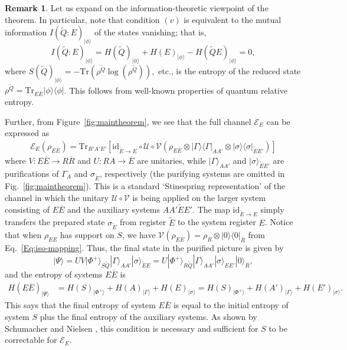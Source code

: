 \documentclass[11pt]{amsart}
\theoremstyle{definition}
\theoremstyle{definition}
\theoremstyle{definition}
\newtheorem{remark}[thm]{Remark}
\newcommand{\mc}{\mathcal}
\newcommand{\tr}{\textrm{Tr}}
\newcommand{\id}{\textrm{id}}
\newcommand{\op}[2]{|#1\rangle\langle #2|}
\newcommand{\1}{\mathbb{I}}
\newcommand{\wt}{\widetilde}
\newcommand{\T}[1]{\widetilde{#1}} %
\def\ket#1{| #1 \rangle}
\begin{document}
\begin{remark}
Let us expand on the information-theoretic viewpoint of the theorem. In particular, note that condition $(v)$ is equivalent to the mutual information $I(\T{Q}:E)_{\ket{\phi}}$ of the states vanishing; that is, 
\begin{equation}\label{mutualinformationequation}
    I(\T{Q}:E)_{\ket{\phi}} = H(\T{Q})_{\ket{\phi}} + H(E)_{\ket{\phi}} - H(\T{Q}E)_{\ket{\phi}} = 0, 
\end{equation}
where $S(\T{Q})_{\ket{\phi}} = - \tr (\rho^{\T{Q}} \log (\rho^{\T{Q}}) ),$ etc., is the entropy of the reduced state $\rho^{\T{Q}}=\tr_{E\overline{E}}\op{\phi}{\phi}$. This follows from well-known properties of quantum relative entropy.  

Further, from Figure~\ref{fig:maintheorem}, we see that the full channel $\mc{E}_E$ can be expressed as
\begin{align}
    \mc{E}_E(\rho_{E\overline{E}})=\tr_{R'A'E'}[\id_{\wt{E}\to E}\circ\mc{U}\circ\mc{V}(\rho_{E\overline{E}}\otimes\op{\Gamma}{\Gamma}_{AA'}\otimes\op{\sigma}{\sigma}_{\wt{E}E'})]
\end{align}
where $V:E\overline{E}\to R\overline{R}$ and $U:RA\to\overline{E}$ are unitaries, while $\ket{\Gamma}_{AA'}$ and $\ket{\sigma}_{\wt{E}E'}$ are purifications of $\Gamma_A$ and $\sigma_{\wt{E}}$, respectively (the purifying systems are omitted in Fig.~\ref{fig:maintheorem}).  This is a standard `Stinespring representation' of the channel in which the unitary $\mc{U}\circ\mc{V}$ is being applied on the larger system consisting of $E\overline{E}$ and the auxiliary systems $AA'\wt{E}E'$.  The map $\id_{\wt{E}\to E}$ simply transfers the prepared state $\sigma_{\wt{E}}$ from register $\wt{E}$ to the system register $E$. 
Notice that when $\rho_{E\overline{E}}$ has support on $S$, we have $\mc{V}(\rho_{E\overline{E}})=\rho_R\otimes\op{0}{0}_{\overline{R}}$ from Eq.~\eqref{Eq:iso-mapping}.  Thus, the final state in the purified picture is given by 
\[\ket{\Psi}=UV\ket{\Phi^+}_{S\widetilde{Q}}\ket{\Gamma}_{AA'}\ket{\sigma}_{\wt{E}E}=U\ket{\Phi^+}_{R\widetilde{Q}}\ket{\Gamma}_{AA'}\ket{\sigma}_{EE'}\ket{0}_{\overline{R}},\]
and the entropy of systems $E\overline{E}$ is
\begin{align}
H(E\overline{E})_{\ket{\Psi}}&=H(S)_{\ket{\Phi^+}}+H(A)_{\ket{\Gamma}}+H(E)_{\ket{\sigma}}=H(S)_{\ket{\Phi^+}}+H(A')_{\ket{\Gamma}}+H(E')_{\ket{\sigma}}.
\end{align}
This says that the final entropy of system $E\overline{E}$ is equal to the initial entropy of system $S$ plus the final entropy of the auxiliary systems.  As shown by Schumacher and Nielsen \cite{SN96}, this condition is necessary and sufficient for $S$ to be correctable for $\mc{E}_E$.

\end{remark}
\end{document}
